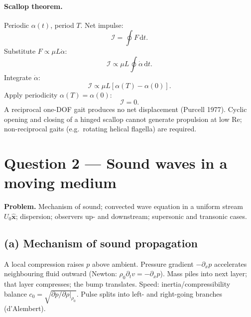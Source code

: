 \documentclass[11pt]{article}
\newcommand{\de}{\mathrm{d}}
\newcommand{\xhat}{\hat{\mathbf{x}}}
\begin{document}
\paragraph{Scallop theorem.} Periodic $\alpha(t)$, period $T$. Net impulse:
\[ \mathcal I = \oint F\,\de t. \]
Substitute $F\propto \mu L\dot\alpha$:
\[ \mathcal I \propto \mu L\oint\dot\alpha\,\de t. \]
Integrate $\dot\alpha$:
\[ \mathcal I \propto \mu L[\alpha(T)-\alpha(0)]. \]
Apply periodicity $\alpha(T)=\alpha(0)$:
\[ \mathcal I = 0. \]
A reciprocal one-DOF gait produces no net displacement (Purcell 1977). Cyclic opening and closing of a hinged scallop cannot generate propulsion at low Re; non-reciprocal gaits (e.g.\ rotating helical flagella) are required.

\section*{Question 2 --- Sound waves in a moving medium}

\textbf{Problem.} Mechanism of sound; convected wave equation in a uniform stream $U_0\xhat$; dispersion; observers up- and downstream; supersonic and transonic cases.

\subsection*{(a) Mechanism of sound propagation}

A local compression raises $p$ above ambient. Pressure gradient $-\partial_x p$ accelerates neighbouring fluid outward (Newton: $\rho_0\partial_t v=-\partial_x p$). Mass piles into next layer; that layer compresses; the bump translates. Speed: inertia/compressibility balance $c_0=\sqrt{\partial p/\partial\rho|_{\rho_0}}$. Pulse splits into left- and right-going branches (d'Alembert).
\end{document}
